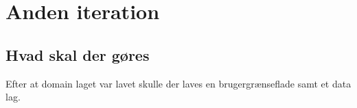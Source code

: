 \section{Anden iteration}

\subsection{Hvad skal der gøres}
Efter at domain laget var lavet skulle der laves en brugergrænseflade samt et data lag. 








